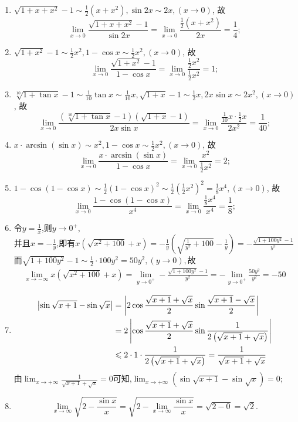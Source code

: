 \begin{solution}
    \begin{enumerate}
        \item $\sqrt{1+x+x^2}-1 \sim \frac{1}{2}(x+x^2) , \sin 2x \sim 2x,(x\to0)$, 故 $$\lim_{x \to 0} \frac{\sqrt{1+x+x^2}-1}{\sin 2x} = \lim_{x \to 0} \frac{\frac{1}{2}(x+x^2)}{2x} = \frac{1}{4};$$
        \item $\sqrt{1+x^2}-1 \sim \frac{1}{2}x^2 , 1-\cos x \sim \frac{1}{2}x^2,(x\to0)$, 故 $$\lim_{x \to 0} \frac{\sqrt{1+x^2}-1}{1-\cos x} = \lim_{x \to 0} \frac{\frac{1}{2}x^2}{\frac{1}{2}x^2} = 1;$$
        \item $\sqrt[10]{1+\tan x}-1 \sim \frac{1}{10}\tan x \sim \frac{1}{10}x , \sqrt{1+x}-1 \sim \frac{1}{2}x , 2x\sin x \sim 2x^2,(x\to0)$, 故 $$\lim_{x \to 0} \frac{(\sqrt[10]{1+\tan x}-1)(\sqrt{1+x}-1)}{2x\sin x} = \lim_{x \to 0} \frac{\frac{1}{10}x \cdot \frac{1}{2}x}{2x^2} = \frac{1}{40};$$
        \item $x \cdot \arcsin(\sin x) \sim x^2 , 1-\cos x \sim \frac{1}{2}x^2,(x\to0)$, 故 $$\lim_{x \to 0} \frac{x \cdot \arcsin(\sin x)}{1-\cos x} = \lim_{x \to 0} \frac{x^2}{\frac{1}{2}x^2} = 2;$$
        \item $1-\cos(1-\cos x) \sim \frac{1}{2}(1-\cos x)^2 \sim \frac{1}{2} \left( \frac{1}{2}x^2 \right)^2 = \frac{1}{8}x^4,(x\to0)$, 故 $$\lim_{x \to 0} \frac{1-\cos(1-\cos x)}{x^4} = \lim_{x \to 0} \frac{\frac{1}{8}x^4}{x^4} = \frac{1}{8};$$
        \item 令$y=\frac{1}{x}$,则$y\to 0^+$,\\
        并且$x=-\frac{1}{y}$,即有$x(\sqrt{x^2+100}+x)=-\frac{1}{y}\left(\sqrt{\frac{1}{y^2}+100}-\frac{1}{y}\right)=-\frac{\sqrt{1+100y^2}-1}{y^2}$\\
        而$\sqrt{1+100y^2}-1\sim \frac{1}{2}\cdot 100y^2=50y^2,(y\to 0),$故
        \begin{align*}
            \lim_{x \to -\infty}x(\sqrt{x^2+100}+x) =\lim_{y \to 0^+}-\frac{\sqrt{1+100y^2}-1}{y^2}=-\lim_{y \to 0^+}\frac{50y^2}{y^2}=-50
        \end{align*} 
        \item \begin{align*}
            \left| \sin \sqrt{x+1}-\sin\sqrt{x} \right| &=\left| 2 \cos \frac{\sqrt{x+1}+\sqrt{x}}{2} \sin \frac{\sqrt{x+1}-\sqrt{x}}{2} \right|  \\
            &=2 \left|\cos \frac{\sqrt{x+1}+\sqrt{x}}{2}\sin \frac{1}{2\left(\sqrt{x+1}+\sqrt{x}\right)}\right|\\
            &\leqslant 2\cdot1\cdot  \frac{1}{2\left(\sqrt{x+1}+\sqrt{x}\right)}=\frac{1}{\sqrt{x+1}+\sqrt{x}}
        \end{align*}
         由$\lim_{x \to +\infty} \frac{1}{\sqrt{x+1}+\sqrt{x}} = 0$可知,$\lim_{x \to +\infty} (\sin\sqrt{x+1}-\sin\sqrt{x}) = 0$;
        \item $$\lim_{x \to \infty} \sqrt{2-\frac{\sin x}{x}} = \sqrt{2 - \lim_{x \to \infty} \frac{\sin x}{x}} = \sqrt{2 - 0} = \sqrt{2}.$$
    \end{enumerate}
\end{solution}

